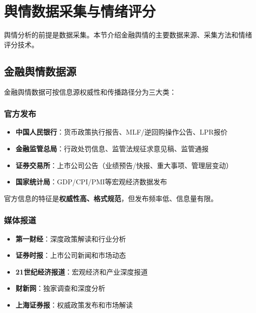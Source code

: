 \section{舆情数据采集与情绪评分}

舆情分析的前提是数据采集。本节介绍金融舆情的主要数据来源、采集方法和情绪评分技术。

\subsection{金融舆情数据源}

金融舆情数据可按信息源权威性和传播路径分为三大类：

\subsubsection{官方发布}

\begin{itemize}[leftmargin=2em]
  \item \textbf{中国人民银行}：货币政策执行报告、MLF/逆回购操作公告、LPR报价
  \item \textbf{金融监管总局}：行政处罚信息、监管法规征求意见稿、监管通报
  \item \textbf{证券交易所}：上市公司公告（业绩预告/快报、重大事项、管理层变动）
  \item \textbf{国家统计局}：GDP/CPI/PMI等宏观经济数据发布
\end{itemize}

官方信息的特征是\textbf{权威性高、格式规范}，但发布频率低、信息量有限。

\subsubsection{媒体报道}

\begin{itemize}[leftmargin=2em]
  \item \textbf{第一财经}：深度政策解读和行业分析
  \item \textbf{证券时报}：上市公司新闻和市场动态
  \item \textbf{21世纪经济报道}：宏观经济和产业深度报道
  \item \textbf{财新网}：独家调查和深度分析
  \item \textbf{上海证券报}：权威政策发布和市场解读
\end{itemize}

